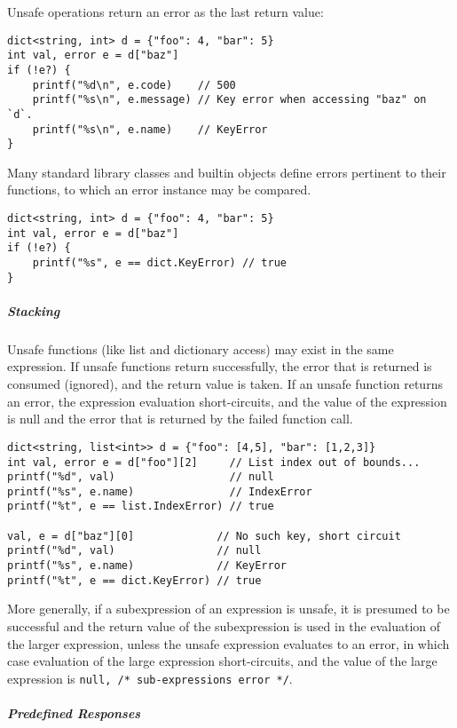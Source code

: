 Unsafe operations return an error as the last return value:

\begin{verbatim}
dict<string, int> d = {"foo": 4, "bar": 5}
int val, error e = d["baz"]
if (!e?) {
    printf("%d\n", e.code)    // 500
    printf("%s\n", e.message) // Key error when accessing "baz" on `d`.
    printf("%s\n", e.name)    // KeyError
}
\end{verbatim}

Many standard library classes and builtin objects define errors
pertinent to their functions, to which an error instance may be
compared.

\begin{verbatim}
dict<string, int> d = {"foo": 4, "bar": 5}
int val, error e = d["baz"]
if (!e?) {
    printf("%s", e == dict.KeyError) // true
}
\end{verbatim}

\subparagraph{Stacking}\label{stacking}

Unsafe functions (like list and dictionary access) may exist in the same
expression. If unsafe functions return successfully, the error that is
returned is consumed (ignored), and the return value is taken. If an
unsafe function returns an error, the expression evaluation
short-circuits, and the value of the expression is null and the error
that is returned by the failed function call.

\begin{verbatim}
dict<string, list<int>> d = {"foo": [4,5], "bar": [1,2,3]}
int val, error e = d["foo"][2]     // List index out of bounds...
printf("%d", val)                  // null
printf("%s", e.name)               // IndexError
printf("%t", e == list.IndexError) // true

val, e = d["baz"][0]             // No such key, short circuit
printf("%d", val)                // null
printf("%s", e.name)             // KeyError
printf("%t", e == dict.KeyError) // true
\end{verbatim}

More generally, if a subexpression of an expression is unsafe, it is
presumed to be successful and the return value of the subexpression is
used in the evaluation of the larger expression, unless the unsafe
expression evaluates to an error, in which case evaluation of the large
expression short-circuits, and the value of the large expression is
\texttt{null, /* sub-expressions error */}.

\subparagraph{Predefined Responses}\label{predefined-responses}

